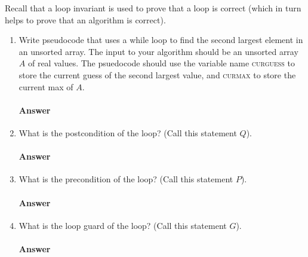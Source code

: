 \documentclass{article}
\begin{document}
\collab{\todo{}} 

Recall that a loop invariant is used to prove that a loop is correct (which in
turn helps to prove that an algorithm is correct).

\begin{enumerate}

    \item Write pseudocode that uses a while loop to find the second largest
        element in an unsorted array.  The input to your algorithm should be an
        unsorted array $A$ of real values.  The psuedocode should use the
        variable name \textsc{curguess} to store the current guess of the second
        largest value, and \textsc{curmax} to store the current max of $A$.

        \paragraph{Answer}


    \item What is the postcondition of the loop? (Call this statement $Q$).

        \paragraph{Answer}


    \item What is the precondition of the loop? (Call this statement $P$).

        \paragraph{Answer}


    \item What is the loop guard of the loop? (Call this statement $G$).

        \paragraph{Answer}


\end{enumerate}
\end{document}
